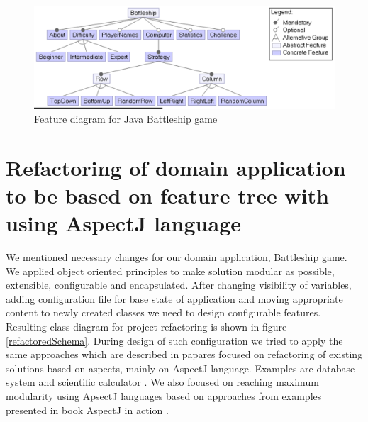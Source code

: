 \documentclass[11pt,english,a4paper,twoside]{article}
\begin{document}
\begin{figure}[t]  %
					\begin{center}
									\includegraphics[width=\linewidth]{fig/battleshipFeatureModel.png}
									\caption{Feature diagram for Java Battleship game}
									\label{battleshipFeatureModel}
					\end{center}
\end{figure}


\section{Refactoring of domain application to be based on feature tree with using AspectJ language} \label{gameRefactoring}

We mentioned necessary changes for our domain application, Battleship game. We applied object oriented principles to make solution modular as possible, extensible, configurable and encapsulated. After changing visibility of variables, adding configuration file for base state of application and moving appropriate content to newly created classes we need to design configurable features. Resulting class diagram for project refactoring is shown in figure \ref{refactoredSchema}. During design of such configuration we tried to apply the same approaches which are described in papares focused on refactoring of existing solutions based on aspects, mainly on AspectJ language. Examples are database system \cite{kastner_case_2007} and scientific calculator \cite{botterweck_automating_2009}. We also focused on reaching maximum modularity using ApsectJ languages based on approaches from examples presented in book AspectJ in action \cite{laddad_aspectj_2003}.
\end{document}
